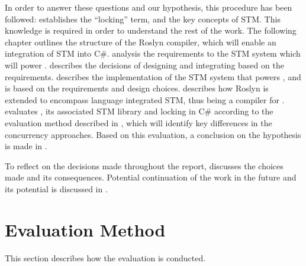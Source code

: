In order to answer these questions and our hypothesis, this procedure has been followed:   establishes the ``locking'' term, and the key concepts of \ac{STM}. This knowledge is required in order to understand the rest of the work. The following chapter  outlines the structure of the Roslyn compiler, which will enable an integration of \ac{STM} into C\#.  analysis the requirements to the \ac{STM} system which will power \stmname.  describes the decisions of designing and integrating \stmname based on the requirements.  describes the implementation of the \ac{STM} system that powers \stmname, and is based on the requirements and design choices.  describes how Roslyn is extended to encompass language integrated \ac{STM}, thus being a compiler for \stmname.  evaluates \stmname, its associated \ac{STM} library and locking in C\# according to the evaluation method described in , which will identify key differences in the concurrency approaches. Based on this evaluation, a conclusion on the hypothesis is made in .

To reflect on the decisions made throughout the report,  discusses the choices made and its consequences. Potential continuation of the work in the future and its potential is discussed in .
\section{Evaluation Method}\label{sec:eval_approach}
This section describes how the evaluation is conducted.
